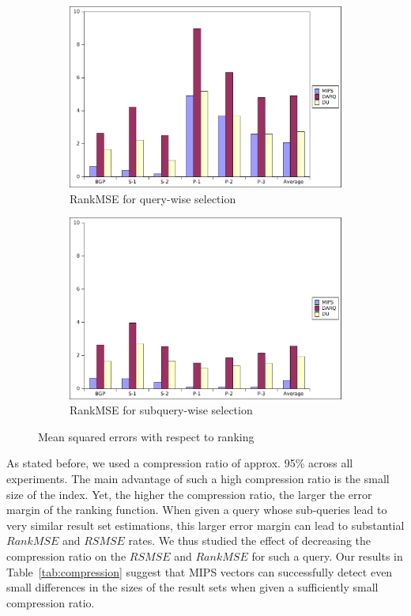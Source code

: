 \documentclass{sig-alternate}  %
\begin{document}
\begin{figure}
\centering				
\begin{subfigure}[b]{0.45\textwidth}
                \centering
\includegraphics[width=\textwidth]{img/querywise_ranking}
                \caption{RankMSE for query-wise selection}
                \label{fig:rankQuery}
        \end{subfigure}				
				\begin{subfigure}[b]{0.45\textwidth}
                \centering
\includegraphics[width=\textwidth]{img/subquerywise_ranking}
                \caption{RankMSE for subquery-wise selection}
                \label{fig:rankSubquery}
        \end{subfigure}
\caption{Mean squared errors with respect to ranking}
\label{fig:rank}
\end{figure}

As stated before, we used a compression ratio of approx. 95\% across all experiments. 
The main advantage of such a high compression ratio is the small size of the index. 
Yet, the higher the compression ratio, the larger the error margin of the ranking function.
When given a query whose sub-queries lead to very similar result set estimations,  this larger error margin can lead to substantial $RankMSE$ and $RSMSE$ rates.
We thus studied the effect of decreasing the compression ratio on the $RSMSE$ and $RankMSE$ for such a query.
Our results in Table~\ref{tab:compression} suggest that MIPS vectors can successfully detect even small differences in the sizes of the result sets when given a sufficiently small compression ratio.
\end{document}
